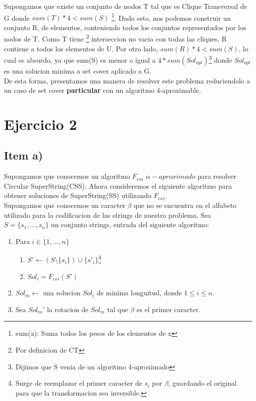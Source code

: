 \documentclass[10pt,a4paper]{article}
\begin{document}
Supongamos que existe un conjunto de nodos T tal que es Clique Transversal de G donde $sum(T)*4 < sum(S)$ \footnote{sum(x): Suma todos los pesos de los elementos de x}. Dado esto, nos podemos construir un conjunto R, de elementos, conteniendo todos los conjuntos representados por los nodos de T. Como T tiene \footnote{Por definicion de CT} interseccion no vacia con todas las cliques, R contiene a todos los elementos de U. Por otro lado, $sum(R)*4 < sum(S)$, lo cual es absurdo, ya que sum(S) es menor o igual a $4*sum(Sol_{opt})$\footnote{Dijimos que S venia de un algoritmo 4-aproximado} donde $Sol_{opt}$ es una solucion minima a set cover aplicado a G.\\

De esta forma, presentamos una manera de resolver este problema reduciendolo a un caso de set cover \textbf{particular} con un algoritmo 4-aproximable.

\section{Ejercicio 2}

\subsection{Item a)}
Supongamos que conocemos un algoritmo $F_{css}$ $\alpha-aproximado$ para resolver Circular SuperString(CSS). Ahora consideremos el siguiente algoritmo para obtener soluciones de SuperString(SS) utilizando $F_{css}$.\\

Supongamos que conocemos un caracter $\beta$ que no se encuentra en el alfabeto utilizado para la codificacion de las strings de nuestro problema. Sea $S = \{s_1, \dots, s_n\}$ un conjunto strings, entrada del siguiente algoritmo:

\begin{enumerate}
    \item Para $i \in \{1, \dots, n\}$
    \begin{enumerate}
    \item  $S' \gets (S \setminus \{s_i\}) \cup   \{ s'_i \}$\footnote{Surge de reemplazar el primer caracter de $s_i$ por $\beta$, guardando el original para que la transformacion sea inversible.}
    \item $Sol_i = F_{css}(S')$ 
    \end{enumerate}
    
    \item $Sol_{m} \gets $ una solucion $Sol_i$ de minima longuitud, donde $1 \leq i \leq n$.
    
    \item Sea $Sol_{m}'$ la rotacion de $Sol_{m}$ tal que $\beta$ es el primer caracter.
\end{enumerate}
\end{document}
